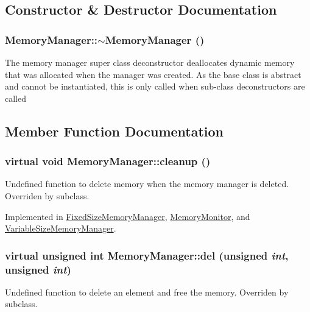 \subsection{Constructor \& Destructor Documentation}
\hypertarget{classMemoryManager_ad4570910ccfc14b2da679bee58ee8f48}{
\subsubsection[{$\sim$MemoryManager}]{\setlength{\rightskip}{0pt plus 5cm}MemoryManager::$\sim$MemoryManager ()}}
\label{classMemoryManager_ad4570910ccfc14b2da679bee58ee8f48}
The memory manager super class deconstructor deallocates dynamic memory that was allocated when the manager was created. As the base class is abstract and cannot be instantiated, this is only called when sub-\/class deconstructors are called 

\subsection{Member Function Documentation}
\hypertarget{classMemoryManager_ab24d56675e49909dfa6ccc67163d9add}{
\subsubsection[{cleanup}]{\setlength{\rightskip}{0pt plus 5cm}virtual void MemoryManager::cleanup ()}}
\label{classMemoryManager_ab24d56675e49909dfa6ccc67163d9add}
Undefined function to delete memory when the memory manager is deleted. Overriden by subclass. 

Implemented in \hyperlink{classFixedSizeMemoryManager_a1661dd249c37ba16c409c9155985429c}{FixedSizeMemoryManager}, \hyperlink{classMemoryMonitor_ac31e19cbcae35d0fb865c3380f355e37}{MemoryMonitor}, and \hyperlink{classVariableSizeMemoryManager_a554860923dc36f775fd5037078a42aeb}{VariableSizeMemoryManager}.

\hypertarget{classMemoryManager_af63cdf4a0fdbd5eb328e13959ff4c5b5}{
\subsubsection[{del}]{\setlength{\rightskip}{0pt plus 5cm}virtual unsigned int MemoryManager::del (unsigned {\em int}, \/  unsigned {\em int})}}
\label{classMemoryManager_af63cdf4a0fdbd5eb328e13959ff4c5b5}
Undefined function to delete an element and free the memory. Overriden by subclass. 

